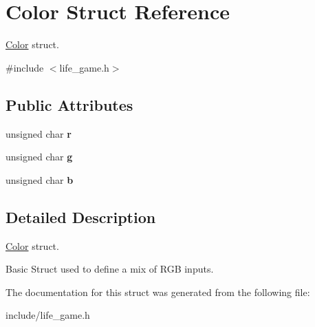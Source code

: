 \hypertarget{structColor}{}\section{Color Struct Reference}
\label{structColor}


\hyperlink{structColor}{Color} struct.  




{\ttfamily \#include $<$life\+\_\+game.\+h$>$}

\subsection*{Public Attributes}
\begin{DoxyCompactItemize}
\item 
\mbox{\label{structColor_ab9a9c7134511f9b116a6fcc81a303ba6}} 
unsigned char {\bfseries r}
\item 
\mbox{\label{structColor_adc506c5063609cacdda2c007da3b7a5f}} 
unsigned char {\bfseries g}
\item 
\mbox{\label{structColor_a9f00605f7024dcb79342e97fae52c1bd}} 
unsigned char {\bfseries b}
\end{DoxyCompactItemize}


\subsection{Detailed Description}
\hyperlink{structColor}{Color} struct. 

Basic Struct used to define a mix of R\+GB inputs. 

The documentation for this struct was generated from the following file\+:\begin{DoxyCompactItemize}
\item 
include/life\+\_\+game.\+h\end{DoxyCompactItemize}

